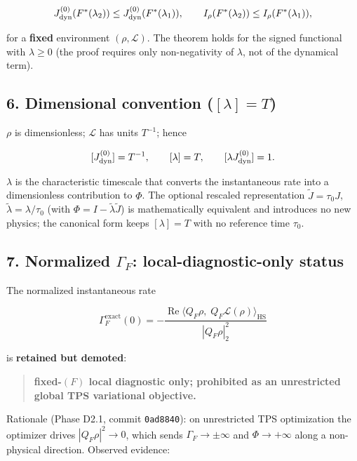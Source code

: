 \documentclass[
]{article}
\begin{document}
\[
J_{\rm dyn}^{(0)}(F^*(\lambda_2)) \le J_{\rm dyn}^{(0)}(F^*(\lambda_1)),
\qquad
I_\rho(F^*(\lambda_2)) \le I_\rho(F^*(\lambda_1)),
\]

for a \textbf{fixed} environment \((\rho,\mathcal L)\). The theorem
holds for the signed functional with \(\lambda \ge 0\) (the proof
requires only non-negativity of \(\lambda\), not of the dynamical term).

\subsection{\texorpdfstring{6. Dimensional convention
(\([\lambda] = T\))}{6. Dimensional convention ({[}\textbackslash lambda{]} = T)}}\label{dimensional-convention-lambda-t}

\(\rho\) is dimensionless; \(\mathcal L\) has units \(T^{-1}\); hence

\[
[J_{\rm dyn}^{(0)}] = T^{-1},
\qquad
[\lambda] = T,
\qquad
[\lambda J_{\rm dyn}^{(0)}] = 1 .
\]

\(\lambda\) is the characteristic timescale that converts the
instantaneous rate into a dimensionless contribution to \(\Phi\). The
optional rescaled representation \(\tilde J = \tau_0 J\),
\(\tilde\lambda = \lambda/\tau_0\) (with
\(\Phi = I - \tilde\lambda \tilde J\)) is mathematically equivalent and
introduces no new physics; the canonical form keeps \([\lambda]=T\) with
no reference time \(\tau_0\).

\subsection{\texorpdfstring{7. Normalized \(\Gamma_F\):
local-diagnostic-only
status}{7. Normalized \textbackslash Gamma\_F: local-diagnostic-only status}}\label{normalized-gamma_f-local-diagnostic-only-status}

The normalized instantaneous rate

\[
\Gamma_F^{\mathrm{exact}}(0)
= -\frac{\operatorname{Re}\langle Q_F\rho,\; Q_F\mathcal L(\rho)\rangle_{\mathrm{HS}}}
{|Q_F\rho|_2^2}
\]

is \textbf{retained but demoted}:

\begin{quote}
\textbf{fixed-\((F)\) local diagnostic only; prohibited as an
unrestricted global TPS variational objective.}
\end{quote}

Rationale (Phase D2.1, commit \texttt{0ad8840}): on unrestricted TPS
optimization the optimizer drives \(|Q_F\rho|^2 \to 0\), which sends
\(\Gamma_F \to
\pm\infty\) and \(\Phi \to +\infty\) along a non-physical direction.
Observed evidence:
\end{document}
